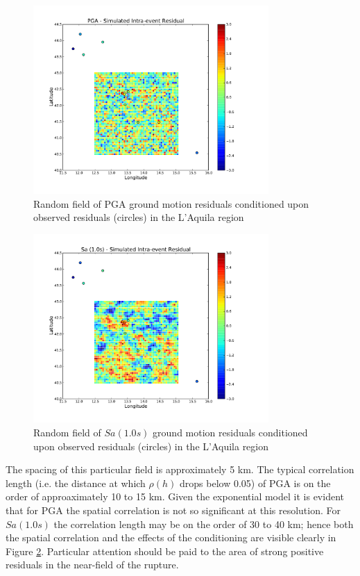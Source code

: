 \begin{figure}[htb]
	\centering
		\includegraphics[trim=10mm 10mm 10mm 10mm, clip, width=0.8\textwidth]{./figures/hazard/LAquila_Simulated_Epison_PGA.pdf}
	\caption{Random field of PGA ground motion residuals conditioned upon observed residuals (circles) in the L'Aquila region}
	\label{fig:laquila_epsilon_pga}
\end{figure}
\begin{figure}[htb]
	\centering
		\includegraphics[trim=10mm 10mm 10mm 10mm, clip, width=0.8\textwidth]{./figures/hazard/LAquila_Simulated_Epsilon_Sa1.pdf}
	\caption{Random field of $Sa \left( {1.0 s} \right)$ ground motion residuals conditioned upon observed residuals (circles) in the L'Aquila region}
	\label{fig:laquila_epsilon_sa1}
\end{figure}

The spacing of this particular field is approximately 5 km. The typical correlation length (i.e. the distance at which $\rho \left( h \right)$ drops below 0.05) of PGA is on the order of approaximately 10 to 15 km. Given the exponential model it is evident that for PGA the spatial correlation is not so significant at this resolution. For $Sa \left( {1.0 s} \right)$ the correlation length may be on the order of 30 to 40 km; hence both the spatial correlation and the effects of the conditioning are visible clearly in Figure \ref{fig:laquila_epsilon_sa1}. Particular attention should be paid to the area of strong positive residuals in the near-field of the rupture.

